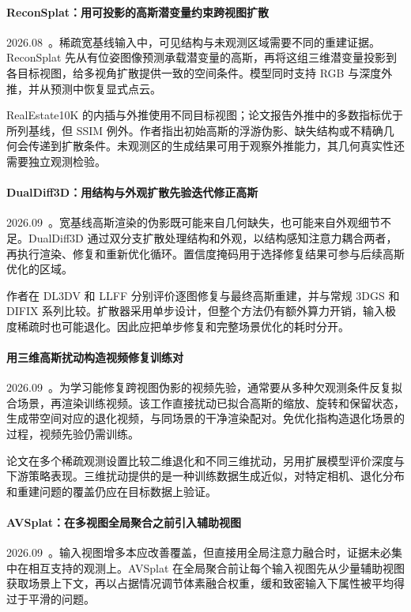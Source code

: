 \paragraph{ReconSplat：用可投影的高斯潜变量约束跨视图扩散}
2026.08~\cite{2608_28895}。稀疏宽基线输入中，可见结构与未观测区域需要不同的重建证据。ReconSplat 先从有位姿图像预测承载潜变量的高斯，再将这组三维潜变量投影到各目标视图，给多视角扩散提供一致的空间条件。模型同时支持 RGB 与深度外推，并从预测中恢复显式点云。

RealEstate10K 的内插与外推使用不同目标视图；论文报告外推中的多数指标优于所列基线，但 SSIM 例外。作者指出初始高斯的浮游伪影、缺失结构或不精确几何会传递到扩散条件。未观测区的生成结果可用于观察外推能力，其几何真实性还需要独立观测检验。

\paragraph{DualDiff3D：用结构与外观扩散先验迭代修正高斯}
2026.09~\cite{2609_01516}。宽基线高斯渲染的伪影既可能来自几何缺失，也可能来自外观细节不足。DualDiff3D 通过双分支扩散处理结构和外观，以结构感知注意力耦合两者，再执行渲染、修复和重新优化循环。置信度掩码用于选择修复结果可参与后续高斯优化的区域。

作者在 DL3DV 和 LLFF 分别评价逐图修复与最终高斯重建，并与常规 3DGS 和 DIFIX 系列比较。扩散器采用单步设计，但整个方法仍有额外算力开销，输入极度稀疏时也可能退化。因此应把单步修复和完整场景优化的耗时分开。

\paragraph{用三维高斯扰动构造视频修复训练对}
2026.09~\cite{2609_03657}。为学习能修复跨视图伪影的视频先验，通常要从多种欠观测条件反复拟合场景，再渲染训练视频。该工作直接扰动已拟合高斯的缩放、旋转和保留状态，生成带空间对应的退化视频，与同场景的干净渲染配对。免优化指构造退化场景的过程，视频先验仍需训练。

论文在多个稀疏观测设置比较二维退化和不同三维扰动，另用扩展模型评价深度与下游策略表现。三维扰动提供的是一种训练数据生成近似，对特定相机、退化分布和重建问题的覆盖仍应在目标数据上验证。

\paragraph{AVSplat：在多视图全局聚合之前引入辅助视图}
2026.09~\cite{2609_05925}。输入视图增多本应改善覆盖，但直接用全局注意力融合时，证据未必集中在相互支持的观测上。AVSplat 在全局聚合前让每个输入视图先从少量辅助视图获取场景上下文，再以占据情况调节体素融合权重，缓和致密输入下属性被平均得过于平滑的问题。

